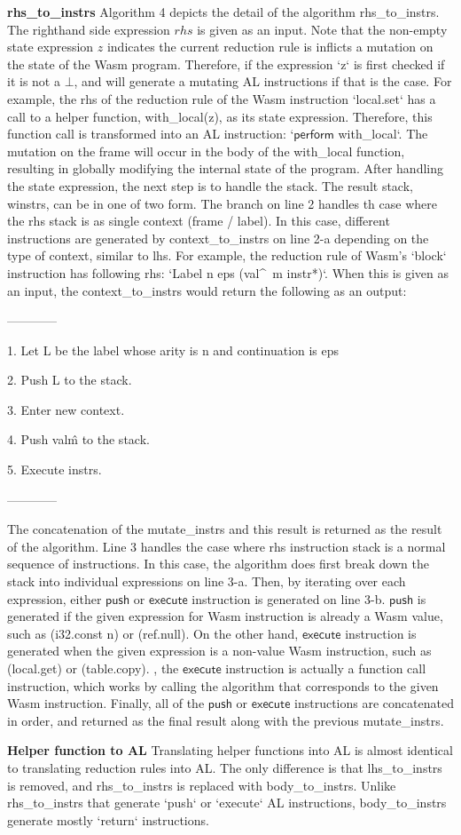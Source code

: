 \textbf{rhs\_to\_instrs} Algorithm 4 depicts the detail of the algorithm rhs\_to\_instrs.
The righthand side expression $rhs$ is given as an input.
Note that the non-empty state expression $z$ indicates the current reduction rule is
inflicts a mutation on the state of the Wasm program. Therefore, if the expression `z`
is first checked if it is not a $\bot$, and will generate a mutating AL instructions if
that is the case. For example, the rhs of the reduction rule of the Wasm instruction
`local.set` has a call to a helper function, with\_local(z), as its state expression.
Therefore, this function call is transformed into an AL instruction: `$\mathsf{perform}$ with\_local`.
The mutation on the frame will occur in the body of the with\_local function, resulting in globally
modifying the internal state of the program. After handling the state expression, the next step is to
handle the stack. The result stack, winstrs, can be in one of two form. The branch on
line 2 handles th case where the rhs stack is as single context (frame / label). In this case,
different instructions are generated by context\_to\_instrs on line 2-a depending on the type of context,
similar to lhs. For example, the reduction rule of Wasm's `block` instruction has following rhs:
`Label n eps (val\^~m instr*)`. When this is given as an input, the context\_to\_instrs would return the
following as an output:

------------

1. Let L be the label whose arity is n and continuation is eps

2. Push L to the stack.

3. Enter new context.

4. Push val\^m to the stack.

5. Execute instrs.

------------

The concatenation of the mutate\_instrs and this result is returned as the result of the algorithm.
Line 3 handles the case where rhs instruction stack is a normal sequence of instructions. In this case,
the algorithm does first break down the stack into individual expressions on line 3-a. Then,
by iterating over each expression, either $\mathsf{push}$ or $\mathsf{execute}$ instruction is
generated on line 3-b. $\mathsf{push}$ is generated if the given expression for Wasm instruction is
already a Wasm value, such as (i32.const n) or (ref.null). On the other hand, $\mathsf{execute}$ instruction is generated
when the given expression is a non-value Wasm instruction, such as (local.get) or (table.copy).
, the $\mathsf{execute}$ instruction is actually a function call instruction,
which works by calling the algorithm that corresponds to the given Wasm instruction.
Finally, all of the $\mathsf{push}$ or $\mathsf{execute}$ instructions are concatenated in order, and
returned as the final result along with the previous mutate\_instrs.

\textbf{Helper function to AL} Translating helper functions into
AL is almost identical to translating reduction rules into AL. The only difference is that lhs\_to\_instrs
is removed, and rhs\_to\_instrs is replaced with body\_to\_instrs. Unlike
rhs\_to\_instrs that generate `push` or `execute` AL instructions, body\_to\_instrs generate mostly
`return` instructions.
